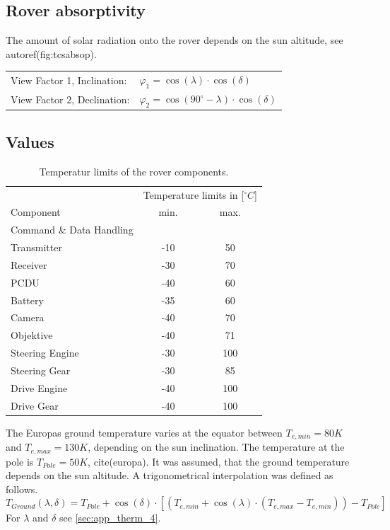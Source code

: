 \subsection{Rover absorptivity} \label{sec:app_therm_4}
The amount of solar radiation onto the rover depends on the sun altitude, see autoref(fig:tcsabsop).

\begin{table}[H]
	\begin{tabular}{l@{\qquad}l}
		View Factor 1, Inclination:& $ \varphi_1=\cos (\lambda) \cdot \cos (\delta)  $ \\
		View Factor 2, Declination:&$ \varphi_2=\cos (90^{\circ}-\lambda) \cdot \cos (\delta)  $\\
	\end{tabular}
\end{table}





\subsection{Values} \label{sec:app_therm_5}
\begin{table}[htb]
	\centering
	\begin{tabular}{lcc}
		\hline
		 & \multicolumn{2}{l}{Temperature limits in [$^\circ C$]} \\ 
		Component	&	min. & max. \\\hline
		Command \& Data Handling & & \\
		Transmitter & -10 & 50 \\
		Receiver & -30 & 70 \\
		PCDU & -40 & 60 \\
		Battery & -35 & 60 \\
		Camera & -40 & 70 \\
		Objektive  & -40 & 71 \\
		Steering Engine & -30 & 100 \\
		Steering Gear & -30 & 85 \\
		Drive Engine & -40 & 100 \\
		Drive Gear & -40 & 100 \\ \hline
	\end{tabular}
	\caption{Temperatur limits of the rover components.}
	\label{tab:tcs_limits}
\end{table}

The Europas ground temperature varies at the  equator between $T_{e,min}=80K$ and $T_{e,max}=130 K$, depending on the sun inclination.
The temperature at the pole is $T_{Pole}=50K$, cite(europa).
It was assumed, that the ground temperature depends on the sun altitude.
A trigonometrical interpolation was defined as follows.
\[ T_{Ground}(\lambda, \delta) = T_{Pole} + \cos (\delta) \cdot [(T_{e,min}+\cos (\lambda)\cdot (T_{e,max}-T_{e,min}))-T_{Pole}] \]
For $\lambda$ and $\delta$ see \autoref{sec:app_therm_4}.


